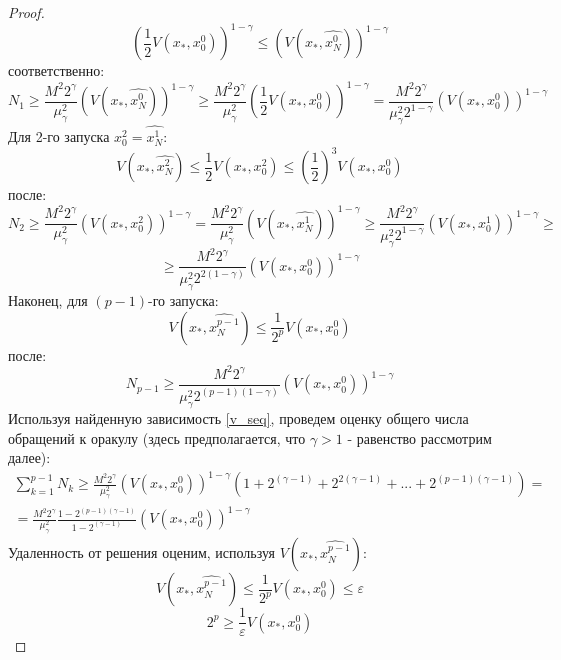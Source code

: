 \begin{proof}
$$       $$
       $$
            (\frac{1}{2} V(x_*, x_0^0))^{1 - \gamma} \leq (V(x_*, \widehat{x_N^0}))^{1 - \gamma}
       $$
       соответственно:
       $$
           N_1 \geq \frac{M^2 2^{\gamma}}{\mu_{\gamma}^2} (V(x_*, \widehat{x_N^0}))^{1 - \gamma} \geq \frac{M^2 2^{\gamma}}{\mu_{\gamma}^2} (\frac{1}{2} V(x_*, x_0^0))^{1 - \gamma} = \frac{M^2 2^{\gamma}}{\mu_{\gamma}^2 2^{1-\gamma}} (V(x_*, x_0^0))^{1 - \gamma}
       $$
       Для 2-го запуска $x_0^2 = \widehat{x_N^1}$:
       $$
           V(x_*, \widehat{x_N^2}) \leq \frac{1}{2} V(x_*, x_0^2) \leq (\frac{1}{2})^3 V(x_*, x_0^0) 
       $$
       после:
       $$
           N_2 \geq \frac{M^2 2^{\gamma}}{\mu_{\gamma}^2} (V(x_*, x_0^2))^{1 - \gamma} = \frac{M^2 2^{\gamma}}{\mu_{\gamma}^2} (V(x_*, \widehat{x_N^1}))^{1 - \gamma} \geq \frac{M^2 2^{\gamma}}{\mu_{\gamma}^2 2^{1 - \gamma}} (V(x_*, x_0^1))^{1 - \gamma} \geq 
       $$
       $$
           \geq \frac{M^2 2^{\gamma}}{\mu_{\gamma}^2 2^{2(1 - \gamma)}} (V(x_*, x_0^0))^{1 - \gamma} 
       $$
       Наконец, для $(p-1)$-го запуска:
       \begin{equation} \label{v_seq}
           V(x_*, \widehat{x_N^{p-1}}) \leq \frac{1}{2^p} V(x_*, x_0^0)
       \end{equation}
       после:
       \begin{equation} \label{n_seq}
           N_{p-1} \geq \frac{M^2 2^{\gamma}}{\mu_{\gamma}^2 2^{(p - 1)(1 - \gamma)}} (V(x_*, x_0^0))^{1 - \gamma}
       \end{equation}
       Используя найденную зависимость \eqref{v_seq}, проведем оценку общего числа обращений к оракулу (здесь предполагается, что $\gamma > 1$ - равенство рассмотрим далее):
       \begin{equation} \label{n_p_sum}
       \begin{aligned}
           \sum_{k=1}^{p - 1} N_k \geq \frac{M^2 2^{\gamma}}{\mu_{\gamma}^2} (V(x_*, x_0^0))^{1 - \gamma} (1 + 2^{(\gamma-1)} + 2^{2(\gamma - 1)} + ... + 2^{(p-1)(\gamma - 1)}) = \\
           = \frac{M^2 2^{\gamma}}{\mu_{\gamma}^2} \frac{1 - 2^{(p-1)(\gamma-1)}}{1 - 2^{(\gamma-1)}} (V(x_*, x_0^0))^{1 - \gamma}
       \end{aligned}
       \end{equation}
       Удаленность от решения оценим, используя $V(x_*, \widehat{x_N^{p-1}})$:
       $$
           V(x_*, \widehat{x_N^{p-1}}) \leq \frac{1}{2^p} V(x_*, x_0^0) \leq \varepsilon
       $$
       $$
            2^p \geq \frac{1}{\varepsilon} V(x_*, x_0^0)
       $$

\end{proof}
